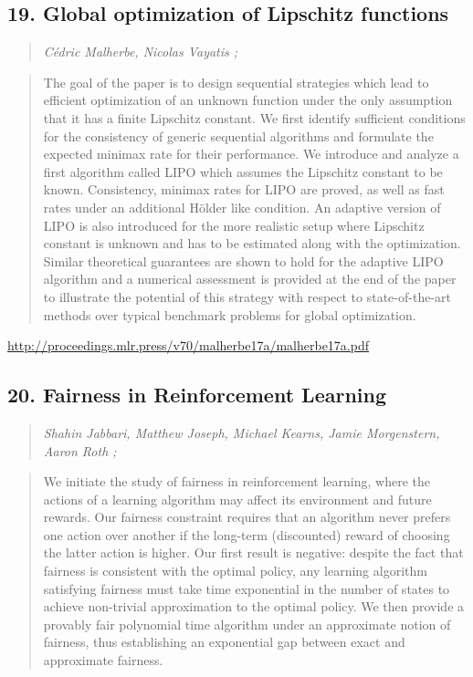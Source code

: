 \documentclass{article}
\begin{document}
\subsection{19. Global optimization of Lipschitz functions}

\begin{quote}
\footnotesize{\textit{Cédric Malherbe, Nicolas Vayatis ;}}

\end{quote}

\begin{quote}
    The goal of the paper is to design sequential strategies which lead to efficient optimization of an unknown function under the only assumption that it has a finite Lipschitz constant. We first identify sufficient conditions for the consistency of generic sequential algorithms and formulate the expected minimax rate for their performance. We introduce and analyze a first algorithm called LIPO which assumes the Lipschitz constant to be known. Consistency, minimax rates for LIPO are proved, as well as fast rates under an additional Hölder like condition. An adaptive version of LIPO is also introduced for the more realistic setup where Lipschitz constant is unknown and has to be estimated along with the optimization. Similar theoretical guarantees are shown to hold for the adaptive LIPO algorithm and a numerical assessment is provided at the end of the paper to illustrate the potential of this strategy with respect to state-of-the-art methods over typical benchmark problems for global optimization.  
\end{quote}

\href{http://proceedings.mlr.press/v70/malherbe17a/malherbe17a.pdf}{http://proceedings.mlr.press/v70/malherbe17a/malherbe17a.pdf}

\subsection{20. Fairness in Reinforcement Learning}

\begin{quote}
\footnotesize{\textit{Shahin Jabbari, Matthew Joseph, Michael Kearns, Jamie Morgenstern, Aaron Roth ;}}

\end{quote}

\begin{quote}
    We initiate the study of fairness in reinforcement learning, where the actions of a learning algorithm may affect its environment and future rewards. Our fairness constraint requires that an algorithm never prefers one action over another if the long-term (discounted) reward of choosing the latter action is higher. Our first result is negative: despite the fact that fairness is consistent with the optimal policy, any learning algorithm satisfying fairness must take time exponential in the number of states to achieve non-trivial approximation to the optimal policy. We then provide a provably fair polynomial time algorithm under an approximate notion of fairness, thus establishing an exponential gap between exact and approximate fairness.  
\end{quote}
\end{document}

